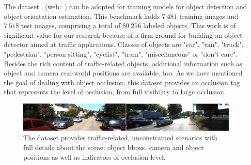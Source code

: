 The  dataset~\cite{geiger2012cvpr} (web:~\cite{webkittiobjdetectiondataset}) can be adopted for training models for object detection and object orientation estimation. This benchmark holds $7\ 481$ training images and $7\ 518$ test images, comprising a total of $80\ 256$ labeled objects. This work is of significant value for our research because of a firm ground for building an object detector aimed at traffic applications. Classes of objects are "car", "van", "truck", "pedestrian", "person sitting", "cyclist", "tram", "miscellaneous" or "don't care". Besides the rich content of traffic-related objects, additional information such as object and camera real-world positions are available, too. As we have mentioned the goal of dealing with object occlusion, this dataset provides an occlusion tag that represents the level of occlusion, from full visibility to large occlusion.

\begin{figure}[t]
    \centerline{\includegraphics[width=0.9\linewidth]{figures/datasets/kitti_detection_sample.pdf}}
    \caption[ dataset]{The  dataset provides traffic-related, unconstrained scenarios with full details about the scene: object \glspl{bbox}, camera and object positions as well as indicators of occlusion level. }
    \label{fig:DatasetKITTIDetection}
\end{figure}
